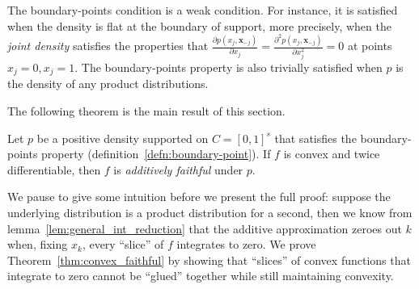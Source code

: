 The boundary-points condition is a weak condition. For instance, it is satisfied when the density is flat at the boundary of support, more precisely, when the \emph{joint density} satisfies the properties that $\frac{\partial p(x_j,\mathbf{x}_{-j})}{\partial x_j} =  \frac{\partial^2 p(x_j, \mathbf{x}_{-j})}{\partial x_j^2} = 0$ at points $x_j = 0, x_j=1$. The boundary-points property is also trivially satisfied when $p$ is the density of any product distributions.

The following theorem is the main result of this section.

\begin{theorem}
\label{thm:convex_faithful}
Let $p$ be a positive density supported on $C=[0,1]^s$ that satisfies the boundary-points property (definition~\ref{defn:boundary-point}). If $f$ is convex and twice differentiable, then $f$ is \emph{additively faithful} under $p$.
\end{theorem}


We pause to give some intuition before we present the full proof: 
suppose the underlying distribution is a product distribution for a second, 
then we know from lemma~\ref{lem:general_int_reduction} that the
additive approximation zeroes out $k$ when, fixing $x_k$, every
``slice'' of $f$ integrates to zero. We prove
Theorem~\ref{thm:convex_faithful} by showing that ``slices'' of convex
functions that integrate to zero cannot be ``glued'' together while
still maintaining convexity.


